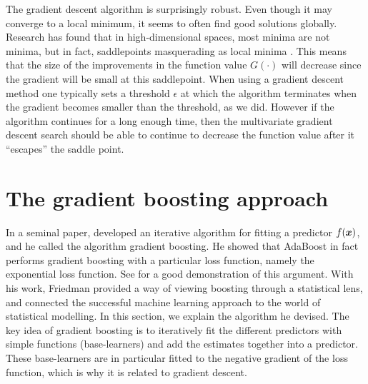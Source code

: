 The gradient descent algorithm is surprisingly robust.
Even though it may converge to a local minimum, it seems to often find good solutions globally.
Research has found that in high-dimensional spaces, most minima are not minima, but in fact, saddlepoints masquerading as local minima \citep{saddlepoints}.
This means that the size of the improvements in the function value $G(\cdot)$ will decrease since the gradient will be small at this saddlepoint.
When using a gradient descent method one typically sets a threshold $\epsilon$ at which the algorithm terminates when the gradient becomes smaller than the threshold, as we did.
However if the algorithm continues for a long enough time, then the multivariate gradient descent search should be able to continue to decrease the function value after it ``escapes'' the saddle point.



\section{The gradient boosting approach}
\label{sec:grad-boost}
In a seminal paper, \citet{friedman2001} developed an iterative algorithm for fitting a predictor $f(\bm{x})$, and he called the algorithm gradient boosting.
He showed that AdaBoost in fact performs gradient boosting with a particular loss function, namely the exponential loss function.
See \citet{ESL} for a good demonstration of this argument.
With his work, Friedman provided a way of viewing boosting through a statistical lens, and connected the successful machine learning approach to the world of statistical modelling.
In this section, we explain the algorithm he devised.
The key idea of gradient boosting is to iteratively fit the different predictors with simple functions (base-learners) and add the estimates together into a predictor.
These base-learners are in particular fitted to the negative gradient of the loss function, which is why it is related to gradient descent.

